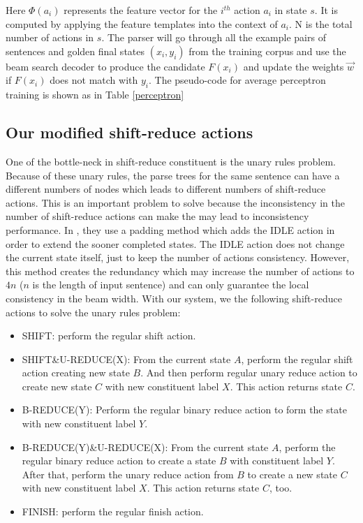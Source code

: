 Here $\Phi(a_i)$ represents the feature vector for the $i^{th}$ action $a_i$ in state $s$. It is computed by applying the feature templates into the context of $a_i$. N is the total number of actions in $s$.
The parser will go through all the example pairs of sentences and golden final states $(x_i, y_i)$ from the training corpus and use the beam search decoder to produce the candidate $F(x_i)$ and update the weights $\vec{w}$ if $F(x_i)$ does not match with $y_i$. The pseudo-code for average perceptron training is shown as in Table \ref{perceptron}

\subsection{Our modified shift-reduce actions}
One of the bottle-neck in shift-reduce constituent is the unary rules problem. Because of these unary rules, the parse trees for the same sentence can have a different numbers of nodes which leads to different numbers of shift-reduce actions. This is an important problem to solve because the inconsistency in the number of shift-reduce actions can make the may lead to inconsistency performance. In \cite{ref:2012Zhu}, they use a padding method which adds the IDLE action in order to extend the sooner completed states. The IDLE action does not change the current state itself, just to keep the number of actions consistency. However, this method creates the redundancy which may increase the number of actions to $4n$ ($n$ is the length of input sentence) and can only guarantee the local consistency in the beam width. With our system, we the following shift-reduce actions to solve the unary rules problem: 
\begin{itemize}
	\item SHIFT: perform the regular shift action.
	\item SHIFT\&U-REDUCE(X): From the current state $A$, perform the regular shift action creating new state $B$. And then perform regular unary reduce action to create new state $C$ with new constituent label $X$. This action returns state $C$.
	\item B-REDUCE(Y): Perform the regular binary reduce action to form the state with new constituent label $Y$.
	\item B-REDUCE(Y)\&U-REDUCE(X): From the current state $A$, perform the regular binary reduce action to create a state $B$ with constituent label $Y$. After that, perform the unary reduce action from $B$ to create a new state $C$ with new constituent label $X$. This action returns state $C$, too.
	\item FINISH: perform the regular finish action.
\end{itemize}

